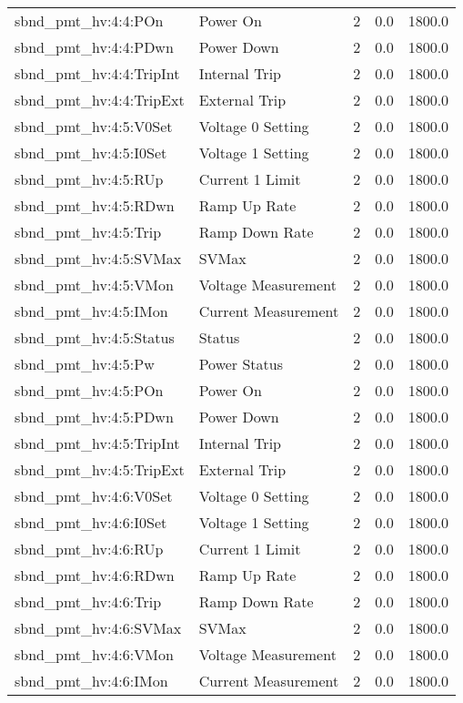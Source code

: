 \begin{center}
\begin{longtable}{l | l l l l }
sbnd\_pmt\_hv:4:4:POn & Power On & 2 & 0.0 & 1800.0\\ 
sbnd\_pmt\_hv:4:4:PDwn & Power Down & 2 & 0.0 & 1800.0\\ 
sbnd\_pmt\_hv:4:4:TripInt & Internal Trip & 2 & 0.0 & 1800.0\\ 
sbnd\_pmt\_hv:4:4:TripExt & External Trip & 2 & 0.0 & 1800.0\\ 
sbnd\_pmt\_hv:4:5:V0Set & Voltage 0 Setting & 2 & 0.0 & 1800.0\\ 
sbnd\_pmt\_hv:4:5:I0Set & Voltage 1 Setting & 2 & 0.0 & 1800.0\\ 
sbnd\_pmt\_hv:4:5:RUp & Current 1 Limit & 2 & 0.0 & 1800.0\\ 
sbnd\_pmt\_hv:4:5:RDwn & Ramp Up Rate & 2 & 0.0 & 1800.0\\ 
sbnd\_pmt\_hv:4:5:Trip & Ramp Down Rate & 2 & 0.0 & 1800.0\\ 
sbnd\_pmt\_hv:4:5:SVMax & SVMax & 2 & 0.0 & 1800.0\\ 
sbnd\_pmt\_hv:4:5:VMon & Voltage Measurement & 2 & 0.0 & 1800.0\\ 
sbnd\_pmt\_hv:4:5:IMon & Current Measurement & 2 & 0.0 & 1800.0\\ 
sbnd\_pmt\_hv:4:5:Status & Status & 2 & 0.0 & 1800.0\\ 
sbnd\_pmt\_hv:4:5:Pw & Power Status & 2 & 0.0 & 1800.0\\ 
sbnd\_pmt\_hv:4:5:POn & Power On & 2 & 0.0 & 1800.0\\ 
sbnd\_pmt\_hv:4:5:PDwn & Power Down & 2 & 0.0 & 1800.0\\ 
sbnd\_pmt\_hv:4:5:TripInt & Internal Trip & 2 & 0.0 & 1800.0\\ 
sbnd\_pmt\_hv:4:5:TripExt & External Trip & 2 & 0.0 & 1800.0\\ 
sbnd\_pmt\_hv:4:6:V0Set & Voltage 0 Setting & 2 & 0.0 & 1800.0\\ 
sbnd\_pmt\_hv:4:6:I0Set & Voltage 1 Setting & 2 & 0.0 & 1800.0\\ 
sbnd\_pmt\_hv:4:6:RUp & Current 1 Limit & 2 & 0.0 & 1800.0\\ 
sbnd\_pmt\_hv:4:6:RDwn & Ramp Up Rate & 2 & 0.0 & 1800.0\\ 
sbnd\_pmt\_hv:4:6:Trip & Ramp Down Rate & 2 & 0.0 & 1800.0\\ 
sbnd\_pmt\_hv:4:6:SVMax & SVMax & 2 & 0.0 & 1800.0\\ 
sbnd\_pmt\_hv:4:6:VMon & Voltage Measurement & 2 & 0.0 & 1800.0\\ 
sbnd\_pmt\_hv:4:6:IMon & Current Measurement & 2 & 0.0 & 1800.0\\ 

\end{longtable}
\end{center}
